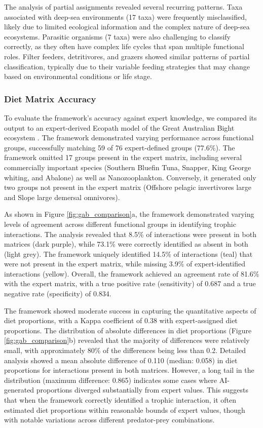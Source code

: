 The analysis of partial assignments revealed several recurring patterns. Taxa associated with deep-sea environments (17 taxa) were frequently misclassified, likely due to limited ecological information and the complex nature of deep-sea ecosystems. Parasitic organisms (7 taxa) were also challenging to classify correctly, as they often have complex life cycles that span multiple functional roles. Filter feeders, detritivores, and grazers showed similar patterns of partial classification, typically due to their variable feeding strategies that may change based on environmental conditions or life stage.

\subsubsection{Diet Matrix Accuracy}
To evaluate the framework's accuracy against expert knowledge, we compared its output to an expert-derived Ecopath model of the Great Australian Bight ecosystem \citep{Fulton2018}. The framework demonstrated varying performance across functional groups, successfully matching 59 of 76 expert-defined groups (77.6\%). The framework omitted 17 groups present in the expert matrix, including several commercially important species (Southern Bluefin Tuna, Snapper, King George whiting, and Abalone) as well as Nanozooplankton. Conversely, it generated only two groups not present in the expert matrix (Offshore pelagic invertivores large and Slope large demersal omnivores).

As shown in Figure \ref{fig:gab_comparison}a, the framework demonstrated varying levels of agreement across different functional groups in identifying trophic interactions. The analysis revealed that 8.5\% of interactions were present in both matrices (dark purple), while 73.1\% were correctly identified as absent in both (light grey). The framework uniquely identified 14.5\% of interactions (teal) that were not present in the expert matrix, while missing 3.9\% of expert-identified interactions (yellow). Overall, the framework achieved an agreement rate of 81.6\% with the expert matrix, with a true positive rate (sensitivity) of 0.687 and a true negative rate (specificity) of 0.834.

The framework showed moderate success in capturing the quantitative aspects of diet proportions, with a Kappa coefficient of 0.38 with expert-assigned diet proportions. The distribution of absolute differences in diet proportions (Figure \ref{fig:gab_comparison}b) revealed that the majority of differences were relatively small, with approximately 80\% of the differences being less than 0.2. Detailed analysis showed a mean absolute difference of 0.110 (median: 0.058) in diet proportions for interactions present in both matrices. However, a long tail in the distribution (maximum difference: 0.865) indicates some cases where AI-generated proportions diverged substantially from expert values. This suggests that when the framework correctly identified a trophic interaction, it often estimated diet proportions within reasonable bounds of expert values, though with notable variations across different predator-prey combinations.

